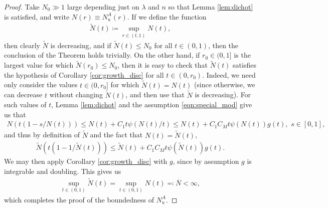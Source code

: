 \documentclass[12pt,leqno]{amsart}
\numberwithin{equation}{section}
\theoremstyle{definition}
\newcommand{\ol}{\overline}
\begin{document}
	\begin{proof}
		Take $N_0 \gg 1$ large depending just on $\lambda$ and $n$ so that Lemma \ref{lem:dichot} is satisfied, and write $N(r) \equiv N_u^A(r)$. If we define the function
		\begin{align*}
			\tilde{N}(t) \coloneqq \sup_{r \in (t, 1)} N(t),
		\end{align*}
		then clearly $\tilde{N}$ is decreasing, and if $\tilde{N}(t) \le N_0$ for all $t \in (0,1)$, then the conclusion of the Theorem holds trivially. On the other hand, if $r_0 \in (0,1]$ is the largest value for which $\tilde{N}(r_0) \le N_0$, then it is easy to check that $\tilde{N}(t)$ satisfies the hypothesis of Corollary \ref{cor:growth_disc} for all $t \in (0, r_0)$. Indeed, we need only consider the values $t \in (0, r_0]$ for which $\tilde{N}(t) = N(t)$ (since otherwise, we can decrease $t$ without changing $\tilde{N}(t)$, and then use that $\tilde{N}$ is decreasing). For such values of $t$, Lemma \ref{lem:dichot} and the assumption \eqref{eqn:special_mod} give us that 
		\begin{align*}
			N(t(1-s/N(t))) \le N(t) + C_1 t \psi(N(t)/t) \le N(t) + C_1 C_M t \psi(N(t)) g(t) , \, \, s \in [0,1],
		\end{align*}
		and thus by definition of $\tilde{N}$ and the fact that $N(t) = \tilde{N}(t)$, 
		\begin{align*}
			\tilde{N}(t(1 - 1/ \tilde{N}(t))) \le \tilde{N}(t) + C_1C_M t \psi(\tilde{N}(t)) g(t).
		\end{align*}
		We may then apply Corollary \ref{cor:growth_disc} with $g$, since by assumption $g$ is integrable and doubling. This gives us
		\begin{align*}
			\sup_{t \in (0,1)} \tilde{N}(t) = \sup_{t \in (0,1)} N(t) \eqqcolon \ol{N} < \infty,
		\end{align*}
		which completes the proof of the boundedness of $N_u^A$. 
		

\end{proof}
\end{document}
